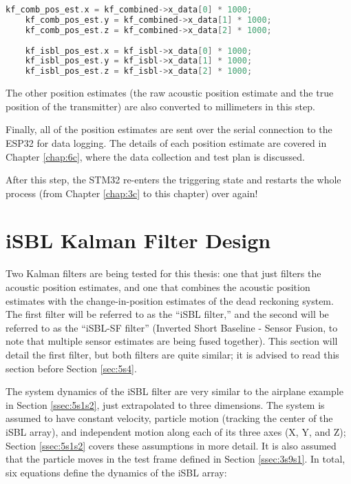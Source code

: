 \documentclass[11pt]{ucthesisCP}
\begin{document}
\begin{lstlisting}[language=C++]
	kf_comb_pos_est.x = kf_combined->x_data[0] * 1000;
	kf_comb_pos_est.y = kf_combined->x_data[1] * 1000;
	kf_comb_pos_est.z = kf_combined->x_data[2] * 1000;
	
	kf_isbl_pos_est.x = kf_isbl->x_data[0] * 1000;
	kf_isbl_pos_est.y = kf_isbl->x_data[1] * 1000;
	kf_isbl_pos_est.z = kf_isbl->x_data[2] * 1000;
\end{lstlisting}

The other position estimates (the raw acoustic position estimate and the true position of the transmitter) are also converted to millimeters in this step.

Finally, all of the position estimates are sent over the serial connection to the ESP32 for data logging. The details of each position estimate are covered in Chapter \ref{chap:6c}, where the data collection and test plan is discussed.

After this step, the STM32 re-enters the triggering state and restarts the whole process (from Chapter \ref{chap:3c} to this chapter) over again!

\section{iSBL Kalman Filter Design} \label{sec:5s3}
Two Kalman filters are being tested for this thesis: one that just filters the acoustic position estimates, and one that combines the acoustic position estimates with the change-in-position estimates of the dead reckoning system. The first filter will be referred to as the “iSBL filter,” and the second will be referred to as the “iSBL-SF filter” (Inverted Short Baseline - Sensor Fusion, to note that multiple sensor estimates are being fused together). This section will detail the first filter, but both filters are quite similar; it is advised to read this section before Section \ref{sec:5s4}.

The system dynamics of the iSBL filter are very similar to the airplane example in Section \ref{ssec:5s1s2}, just extrapolated to three dimensions. The system is assumed to have constant velocity, particle motion (tracking the center of the iSBL array), and independent motion along each of its three axes (X, Y, and Z); Section \ref{ssec:5s1s2} covers these assumptions in more detail. It is also assumed that the particle moves in the test frame defined in Section \ref{ssec:3s9s1}. In total, six equations define the dynamics of the iSBL array:
\end{document}
